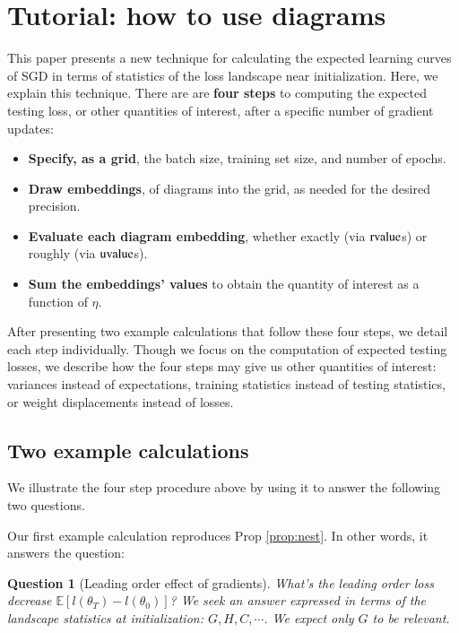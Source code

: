 \documentclass[anon,12pt]{colt2021} %
\newtheorem{quest}{Question}
\newcommand{\uvalue}{\text{\textnormal{uvalue}}}
\newcommand{\rvalue}{\text{\textnormal{rvalue}}}
\newcommand{\expc}{\mathbb{E}}
\begin{document}
{\section{Tutorial: how to use diagrams}                \label{appendix:tutorial}
    This paper presents a new technique for calculating the expected learning
    curves of SGD in terms of statistics of the loss landscape near
    initialization.  Here, we explain this technique.
    There are are {\bf four steps} to computing the expected testing loss, or
    other quantities of interest, after a specific number of gradient updates: 
    \begin{itemize}
        \item {\bf Specify, as a grid}, the batch size, training set
            size, and number of epochs. 
        \item {\bf Draw embeddings}, of diagrams into the
            grid, as needed for the desired precision.
        \item {\bf Evaluate each diagram embedding}, whether exactly
            (via $\rvalue$s)
            or roughly
            (via $\uvalue$s).
        \item {\bf Sum the embeddings' values} to obtain the quantity of
              interest as a function of $\eta$.
    \end{itemize}
    \noindent
    After presenting two example calculations that follow these four steps, we
    detail each step individually.  Though we focus on the computation of
    expected testing losses, we describe how the four steps may give us other
    quantities of interest: variances instead of expectations, training
    statistics instead of testing statistics, or weight displacements instead
    of losses.  

        \subsection{Two example calculations}\label{appendix:example}
            We illustrate the four step procedure above by using it to 
            answer the following two questions.

                Our first example calculation reproduces Prop \ref{prop:nest}.
                In other words, it answers the question:
                \begin{quest}[Leading order effect of gradients]\label{qst:grad}
                    What's the leading order loss decrease
                    $\expc[l(\theta_T)-l(\theta_0)]$?
                    We seek an answer expressed in terms of the landscape
                    statistics at initialization: $G,H,C, \cdots$.  We expect
                    only $G$ to be relevant. 
                \end{quest}

}
\end{document}
